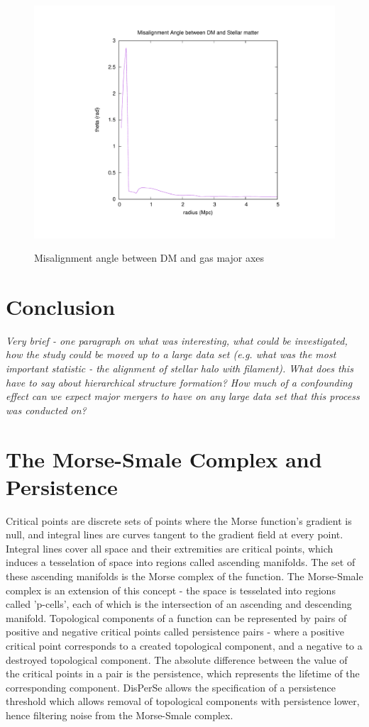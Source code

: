 \documentclass[journal]{IEEEtran}
\begin{document}
\begin{figure}[!t]
\centering
\includegraphics[width=0.5\linewidth]{GasDMAlign.pdf}
\label{fig:DMgasAlign}
\caption{Misalignment angle between DM and gas major axes}
\end{figure}

\section{Conclusion}
\textit{Very brief - one paragraph on what was interesting, what could be investigated, how the study could be moved up to a large data set (e.g. what was the most important statistic - the alignment of stellar halo with filament).
What does this have to say about hierarchical structure formation? How much of a confounding effect can we expect major mergers to have on any large data set that this process was conducted on?}


\appendices
\section{The Morse-Smale Complex and Persistence}
Critical points are discrete sets of points where the Morse function's gradient is null, and integral lines are curves tangent to the gradient field at every point. Integral lines cover all space and their extremities are critical points, which induces a tesselation of space into regions called ascending manifolds. The set of these ascending manifolds is the Morse complex of the function. The Morse-Smale complex is an extension of this concept - the space is tesselated into regions called 'p-cells', each of which is the intersection of an ascending and descending manifold. 
Topological components of a function can be represented by pairs of positive and negative critical points called persistence pairs - where a positive critical point corresponds to a created topological component, and a negative to a destroyed topological component. The absolute difference between the value of the critical points in a pair is the persistence, which represents the lifetime of the corresponding component. DisPerSe allows the specification of a persistence threshold which allows removal of topological components with persistence lower, hence filtering noise from the Morse-Smale complex. 
\end{document}
